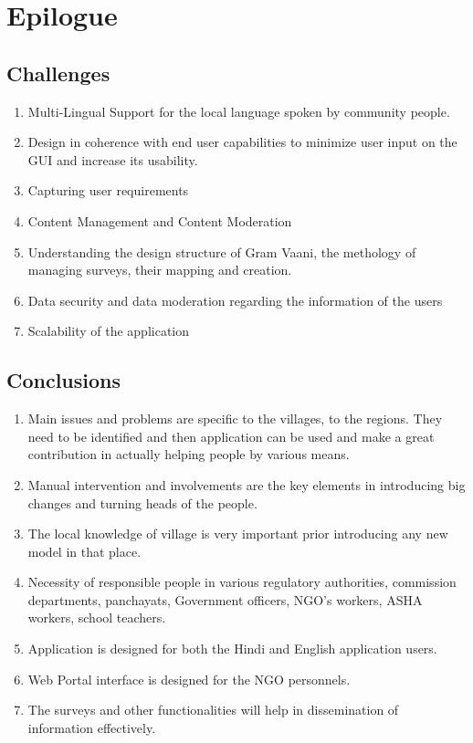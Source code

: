 \chapter{Epilogue}

\section{Challenges}
\begin{enumerate}
\item Multi-Lingual Support for the local language spoken by community people.
\item Design in coherence with end user capabilities to minimize user input on the GUI and increase its usability.
\item Capturing user requirements
\item Content Management and Content Moderation
\item Understanding the design structure of Gram Vaani, the methology of managing surveys, their mapping and creation.
\item Data security and data moderation regarding the information of the users
\item Scalability of the application
\end{enumerate}

\section{Conclusions}

\begin{enumerate}
\item Main issues and problems are specific to the villages, to the regions. They
need to be identified and then application can be used and make a great
contribution in actually helping people by various means.
\item Manual intervention and involvements are the key elements in introducing
big changes and turning heads of the people.
\item The local knowledge of village is very important prior introducing any new
model in that place.
\item Necessity of responsible people in various regulatory authorities, commission
departments, panchayats, Government officers, NGO’s workers, ASHA
workers, school teachers.
\item Application is designed for both the Hindi and English application users.
\item Web Portal interface is designed for the NGO personnels.
\item The surveys and other functionalities will help in dissemination of information effectively.
\end{enumerate}


